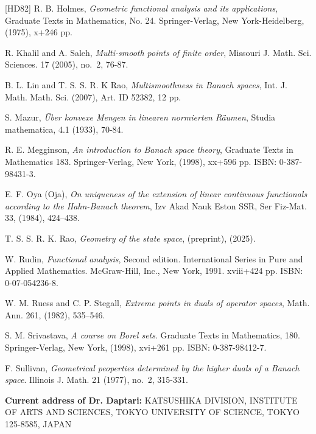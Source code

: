 \documentclass[12pt]{amsart}
\theoremstyle{definition}
\numberwithin{equation}{section}
\begin{document}
\begin{thebibliography}{[HD82]}
 R. B. Holmes,
\emph{Geometric functional analysis and its applications}, Graduate Texts in Mathematics, No. 24. Springer-Verlag, New York-Heidelberg, (1975), {\rm x}+246 pp.

 R. Khalil and A. Saleh,
\emph{Multi-smooth points of finite order}, Missouri J. Math. Sci. Sciences. 17 (2005), no.~2, 76-87.

 B. L. Lin and T. S. S. R. K Rao,
\emph{Multismoothness in Banach spaces}, Int. J. Math. Math. Sci. (2007), Art. ID 52382, 12 pp.

 S. Mazur, \emph{Über konvexe Mengen in linearen normierten Räumen}, Studia mathematica, 4.1 (1933), 70-84.

 R. E. Megginson,
\emph{An introduction to Banach space theory}, Graduate Texts in Mathematics 183. Springer-Verlag, New York, (1998), xx+596 pp. ISBN: 0-387-98431-3.

 E. F. Oya (Oja),
\emph{On uniqueness of the extension of linear continuous functionals according to the Hahn-Banach theorem}, Izv Akad Nauk Eston SSR, Ser Fiz-Mat. 33, (1984), 424–438.

 T. S. S. R. K. Rao, 
\emph{Geometry of the state space}, (preprint), (2025).

 W. Rudin,
\emph{Functional analysis}, Second edition. International Series in Pure and Applied Mathematics. McGraw-Hill, Inc., New York, 1991. {\rm xviii}+424 pp. ISBN: 0-07-054236-8.

W. M. Ruess and C. P. Stegall,
\emph{Extreme points in duals of operator spaces}, Math. Ann. 261, (1982), 535–546.

 S. M. Srivastava,
\emph{A course on Borel sets}. Graduate Texts in Mathematics, 180. Springer-Verlag, New York, (1998), xvi+261 pp. ISBN: 0-387-98412-7.

 F. Sullivan,
\emph{Geometrical peoperties determined by the higher duals of a Banach space}. Illinois J. Math. 21 (1977), no.~2, 315-331.

\end{thebibliography}
\vspace{4mm}
\textbf{Current address of Dr. Daptari:} \tiny{KATSUSHIKA DIVISION, INSTITUTE OF ARTS AND SCIENCES, TOKYO UNIVERSITY OF SCIENCE, TOKYO 125-8585, JAPAN}  
\end{document}
